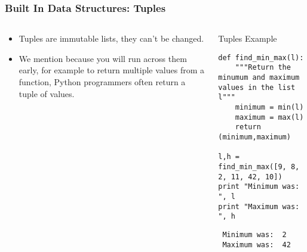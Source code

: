 \documentclass[bigger]{beamer}
\begin{document}
\begin{frame}[fragile]
\frametitle{Built In Data Structures: Tuples}
\label{sec-1-7}
\begin{columns}
\begin{column}{0.4\textwidth}
\label{sec-1-7-1}

\begin{itemize}
\item Tuples are immutable lists, they can't be changed.
\item We mention because you will run across them early, for example to return 
     multiple values from a function, Python programmers often return a tuple of values.
\end{itemize}
\end{column}
\begin{column}{0.6\textwidth}
\begin{block}{Tuples Example}
\label{sec-1-7-2}

\fontsize{6}{7.2}\selectfont

\begin{verbatim}
def find_min_max(l):
    """Return the minumum and maximum values in the list l"""
    minimum = min(l)
    maximum = max(l)
    return (minimum,maximum)

l,h = find_min_max([9, 8, 2, 11, 42, 10])
print "Minimum was: ", l
print "Maximum was: ", h
\end{verbatim}

\begin{verbatim}
 Minimum was:  2
 Maximum was:  42
\end{verbatim}
\end{block}
\end{column}
\end{columns}
\end{frame}
\end{document}
